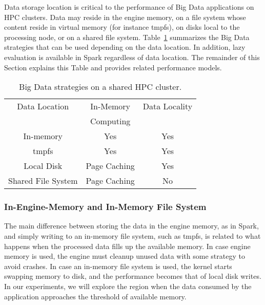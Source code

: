 \documentclass{IEEEtran}
\begin{document}
Data storage location is critical to the performance of Big Data 
applications on HPC clusters.
Data may reside in the engine memory, on 
a file system whose content reside in virtual memory (for instance 
tmpfs), on disks local to the processing node, or on a shared 
file system. Table~\ref{table:features} summarizes the Big Data 
strategies that can be used depending on the data location. In 
addition, lazy evaluation is available in Spark regardless of data 
location. The remainder of this Section explains this Table and 
provides related performance models.
\begin{table}
\centering
\begin{tabular}{c|cc}
   \rowcolor{headcolor}
    Data Location                 & In-Memory     & Data Locality        \\
    \rowcolor{headcolor}
                                  & Computing     &                     \\
                                  \hline          
In-memory                         & \cellcolor{green!25} Yes           & \cellcolor{green!25}Yes                      \\
tmpfs                             & \cellcolor{green!25} Yes           & \cellcolor{green!25}Yes                  \\
Local Disk                        & \cellcolor{orange!25}Page Caching  & \cellcolor{green!25}Yes                  \\
Shared File System                & \cellcolor{orange!25}Page Caching  & \cellcolor{red!25}No                
\end{tabular}
\caption{Big Data strategies on a shared HPC cluster.}
\label{table:features}
\end{table}

\subsubsection{In-Engine-Memory and In-Memory File System} 

 The main difference between storing the data in the engine memory, as in Spark, 
 and simply writing to an in-memory file system, such as tmpfs, is 
 related to what happens when the processed data fills up the available 
 memory. In case engine memory is used, the engine must cleanup 
 unused data with some strategy to avoid crashes. In case an in-memory 
 file system is used, the kernel starts swapping memory to disk, and 
 the performance becomes that of local disk writes. In our experiments, 
 we will explore the region  when the data consumed by the 
 application approaches the threshold of available memory.
\end{document}
